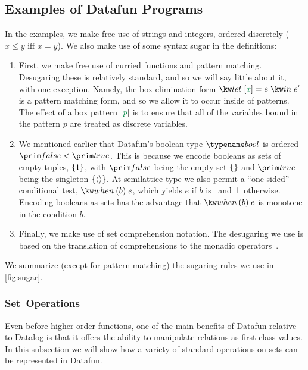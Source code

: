 

\subsection{Examples of Datafun Programs}



In the examples, we make free use of strings and integers, ordered discretely
($x \le y$ iff $x = y$). We also make use of some syntax sugar in the
definitions:

\begin{enumerate}
\item First, we make free use of curried functions and pattern
  matching. Desugaring these is relatively standard, and so we will
  say little about it, with one exception. Namely, the box-elimination
  form $\eletbox x e e'$ is a pattern matching form, and so we allow
  it to occur inside of patterns. The effect of a box pattern
  $\ebox{p}$ is to ensure that all of the variables bound in the
  pattern $p$ are treated as discrete variables.

\item We mentioned earlier that Datafun's boolean type $\tbool$ is ordered
  $\efalse < \etrue$. This is because we encode booleans as sets of empty
  tuples, $\{{1}\}$, with $\efalse$ being the empty set $\eset{}$ and $\etrue$
  being the singleton $\{{\langle{}\rangle}\}$. At semilattice type we also permit
  a ``one-sided'' conditional test, $\ewhen{b}{e}$, which yields $e$ if $b$ is
  \etrue\ and $\bot$ otherwise. Encoding booleans as sets has the advantage that
  $\ewhen{b}{e}$ is monotone in the condition $b$.

\item Finally, we make use of set comprehension notation. The
  desugaring we use is based on the translation of comprehensions to
  the monadic operators~\cite{wadler-monad-comprehensions}.
\end{enumerate}
We summarize (except for pattern matching) the sugaring rules we use in
\cref{fig:sugar}.

\subsubsection{Set\, Operations}

Even before higher-order functions, one of the main benefits of
Datafun relative to Datalog is that it offers the ability to manipulate relations
as first class values. In this subsection we will show how a variety
of standard operations on sets can be represented in Datafun.

